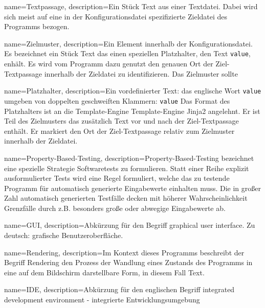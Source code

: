 \makeglossaries

{
    name=Textpassage,
    description={Ein Stück Text aus einer Textdatei. Dabei
            wird sich meist auf eine in der Konfigurationsdatei spezifizierte
            Zieldatei des Programms bezogen.}
}

{
    name=Zielmuster,
    description={Ein Element innerhalb der Konfigurationsdatei. Es bezeichnet ein
            Stück Text das einen speziellen \gls{Platzhalter}, den Text \texttt{{{value}}},
            enhält. Es wird vom Programm dazu genutzt den genauen Ort der Ziel-\gls{Textpassage}
            innerhalb der Zieldatei zu identifizieren. Das Zielmuster sollte}
}

{
    name=Platzhalter,
    description={Ein vordefinierter Text: das englische Wort \texttt{value}
            umgeben von doppelten geschweiften Klammern:
            \texttt{{{value}}} Das Format des Platzhalters ist an
            die Template-Engine Template-Engine Jinja2 \cite{jinja2} angelehnt.
            Er ist Teil des \gls{Zielmuster}s das zusätzlich Text vor und nach
            der Ziel-\gls{Textpassage} enthält. Er markiert den Ort der Ziel-\gls{Textpassage}
            relativ zum \gls{Zielmuster} innerhalb der Zieldatei.}
}

{
    name=Property-Based-Testing,
    description={Property-Based-Testing bezeichnet eine spezielle Strategie Softwaretests
            zu formulieren. Statt einer Reihe explizit ausformulierter Tests wird eine Regel
            formuliert, welche das zu testende Programm für automatisch generierte Eingabewerte
            einhalten muss. Die in großer Zahl automatisch generierten Testfälle
            decken mit höherer Wahrscheinlichkeit Grenzfälle durch z.B. besonders
            große oder abwegige Eingabewerte ab.}
}

{
    name=GUI,
    description={Abkürzung für den Begriff graphical user interface. Zu deutsch:
            grafische Benutzeroberfläche.}
}

{
    name=Rendering,
    description={Im Kontext dieses Programms beschreibt der Begriff Rendering den
            Prozess der Wandlung eines Zustands des Programms in eine auf dem Bildschirm
            darstellbare Form, in diesem Fall Text.}
}

{
    name=IDE,
    description={Abkürzung für den englischen Begriff integrated development
            environment - integrierte Entwicklungsumgebung}
}

